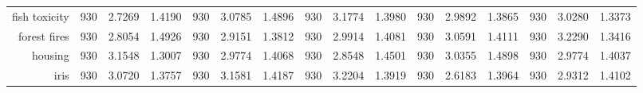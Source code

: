 \begin{table}[H]
{\begin{tabular}{rccccccccccccccc}
			fish toxicity                       & 930                                 & \cellcolor[rgb]{ .776,  .937,  .808}\textcolor[rgb]{ 0,  .38,  0}{2.7269} & 1.4190          & 930                            & 3.0785                                                                             & 1.4896          & 930                             & 3.1774                                                                    & 1.3980          & 930                             & 2.9892                                                                    & 1.3865          & 930                             & 3.0280          & 1.3373          \\
			forest fires                        & 930                                 & \cellcolor[rgb]{ .776,  .937,  .808}\textcolor[rgb]{ 0,  .38,  0}{2.8054} & 1.4926          & 930                            & 2.9151                                                                             & 1.3812          & 930                             & 2.9914                                                                    & 1.4081          & 930                             & 3.0591                                                                    & 1.4111          & 930                             & 3.2290          & 1.3416          \\
			housing                             & 930                                 & 3.1548                                                                    & 1.3007          & 930                            & 2.9774                                                                             & 1.4068          & 930                             & \cellcolor[rgb]{ .776,  .937,  .808}\textcolor[rgb]{ 0,  .38,  0}{2.8548} & 1.4501          & 930                             & 3.0355                                                                    & 1.4898          & 930                             & 2.9774          & 1.4037          \\
			iris                                & 930                                 & 3.0720                                                                    & 1.3757          & 930                            & 3.1581                                                                             & 1.4187          & 930                             & 3.2204                                                                    & 1.3919          & 930                             & \cellcolor[rgb]{ .776,  .937,  .808}\textcolor[rgb]{ 0,  .38,  0}{2.6183} & 1.3964          & 930                             & 2.9312          & 1.4102          \\

\end{tabular}}
\end{table}
